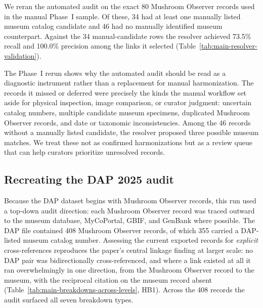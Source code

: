 We reran the automated audit on the exact 80 Mushroom Observer records used in the
manual Phase~I sample. Of these, 34 had at least one manually listed museum
catalog candidate and 46 had no manually identified museum counterpart. Against
the 34 manual-candidate rows the resolver achieved 73.5\% recall and 100.0\%
precision among the links it selected (Table~\ref{tab:main-resolver-validation}).

The Phase~I rerun shows why the automated audit should be read as a diagnostic
instrument rather than a replacement for manual harmonization. The records it
missed or deferred were precisely the kinds the manual workflow set aside for
physical inspection, image comparison, or curator judgment: uncertain catalog
numbers, multiple candidate museum specimens, duplicated Mushroom Observer
records, and date or taxonomic inconsistencies. Among the 46 records without a
manually listed candidate, the resolver proposed three possible museum matches.
We treat these not as confirmed harmonizations but as a review queue that can help
curators prioritize unresolved records.

\subsection{Recreating the DAP 2025 audit}

Because the DAP dataset begins with Mushroom Observer records, this run used a
top-down audit direction: each Mushroom Observer record was traced outward to the
museum database, MyCoPortal, GBIF, and GenBank where possible. The DAP file
contained 408 Mushroom Observer records, of which 355 carried a DAP-listed museum
catalog number. Assessing the current exported records for \emph{explicit}
cross-references reproduces the paper's central linkage finding at larger scale:
no DAP pair was bidirectionally cross-referenced, and where a link existed at all
it ran overwhelmingly in one direction, from the Mushroom Observer record to the
museum, with the reciprocal citation on the museum record absent
(Table~\ref{tab:main-breakdowns-across-levels}, HB1). Across the 408 records the
audit surfaced all seven breakdown types.

